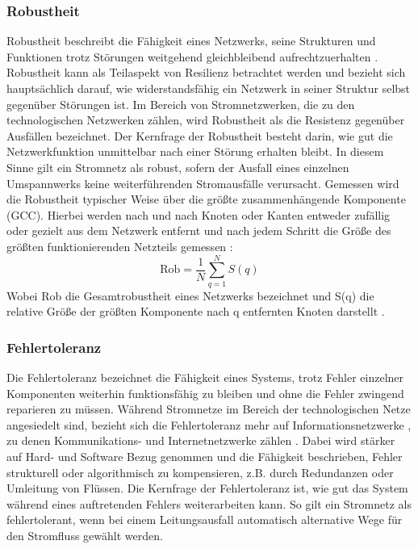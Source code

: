 \subsubsection{Robustheit}
Robustheit beschreibt die Fähigkeit eines Netzwerks, seine Strukturen und Funktionen trotz Störungen weitgehend gleichbleibend aufrechtzuerhalten . Robustheit kann als Teilaspekt von Resilienz betrachtet werden  und bezieht sich hauptsächlich darauf, wie widerstandsfähig ein Netzwerk in seiner Struktur selbst gegenüber Störungen ist. Im Bereich von Stromnetzwerken, die zu den technologischen Netzwerken zählen, wird Robustheit als die Resistenz gegenüber Ausfällen bezeichnet. Der Kernfrage der Robustheit besteht darin, wie gut die Netzwerkfunktion unmittelbar nach einer Störung erhalten bleibt. In diesem Sinne gilt ein Stromnetz als robust, sofern der Ausfall eines einzelnen Umspannwerks keine weiterführenden Stromausfälle verursacht. 
Gemessen wird die Robustheit typischer Weise über die größte zusammenhängende Komponente (GCC). Hierbei werden nach und nach Knoten oder Kanten entweder zufällig oder gezielt aus dem Netzwerk entfernt und nach jedem Schritt die Größe des größten funktionierenden Netzteils gemessen : 
\[
\mathrm{Rob} = \frac{1}{N} \sum_{q=1}^{N} S(q)
\]
Wobei Rob die Gesamtrobustheit eines Netzwerks bezeichnet und S(q) die relative Größe der größten Komponente nach q entfernten Knoten darstellt . 
\subsubsection{Fehlertoleranz}
Die Fehlertoleranz bezeichnet die Fähigkeit eines Systems, trotz Fehler einzelner Komponenten weiterhin funktionsfähig zu bleiben und ohne die Fehler zwingend reparieren zu müssen. Während Stromnetze im Bereich der technologischen Netze angesiedelt sind, bezieht sich die Fehlertoleranz mehr auf Informationsnetzwerke , zu denen Kommunikations- und Internetnetzwerke zählen . Dabei wird stärker auf Hard- und Software Bezug genommen und die Fähigkeit beschrieben, Fehler strukturell oder algorithmisch zu kompensieren, z.B. durch Redundanzen oder Umleitung von Flüssen. Die Kernfrage der Fehlertoleranz ist, wie gut das System während eines auftretenden Fehlers weiterarbeiten kann. So gilt ein Stromnetz als fehlertolerant, wenn bei einem Leitungsausfall automatisch alternative Wege für den Stromfluss gewählt werden. 
